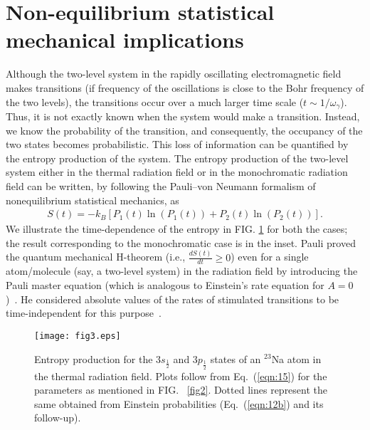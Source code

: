 \documentclass[aps,pra,twocolumn,showpacs,preprintnumbers,amsmath,amssymb,footinbib]{revtex4}
\begin{document}
\section{Non-equilibrium statistical mechanical implications}
Although the two-level system in the rapidly oscillating electromagnetic field makes transitions (if frequency of the oscillations is close to the Bohr frequency of the two levels), the transitions occur over a much larger time scale ($t\sim1/\omega_\gamma$). Thus, it is not exactly known when the system would make a transition. Instead, we know the probability of the transition, and consequently, the occupancy of the two states becomes probabilistic. This loss of information can be quantified by the entropy production of the system. The entropy production of the two-level system either in the thermal radiation field or in the monochromatic radiation field can be written, by following the Pauli--von Neumann formalism of nonequilibrium statistical mechanics, as~\cite{Pauli,Neumann,Feynman}
\begin{eqnarray}\label{eqn:15}
S(t)=-k_B[P_1(t)\ln(P_1(t))+P_2(t)\ln(P_2(t))].
\end{eqnarray}
We illustrate the time-dependence of the entropy in FIG. \ref{fig3} for both the cases; the result corresponding to the monochromatic case is in the inset. Pauli proved the quantum mechanical H-theorem (i.e., $\frac{dS(t)}{dt}\ge0$) even for a single atom/molecule (say, a two-level system) in the radiation field by introducing the Pauli master equation (which is analogous to Einstein's rate equation for $A=0$)~\cite{Pauli,Das}. He considered absolute values of the rates of stimulated transitions to be time-independent for this purpose~\cite{Pauli}. 

\begin{figure}
\texttt{[image: fig3.eps]}
\caption{Entropy production for the $3s_{\frac{1}{2}}$ and $3p_{\frac{1}{2}}$ states of an $^{23}$Na atom in the thermal radiation field. Plots follow from Eq.~(\ref{eqn:15}) for the parameters as mentioned in FIG.~ \ref{fig2}. Dotted lines represent the same obtained from Einstein probabilities (Eq.~(\ref{eqn:12b}) and its follow-up). 
\label{fig3}}
\end{figure}
\end{document}
